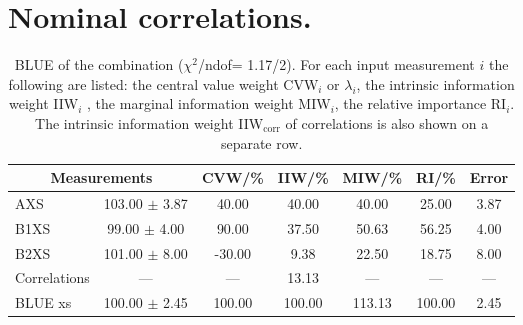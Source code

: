 \section{Nominal correlations.}
\begin{table}[H]
\scriptsize
\begin{center}
\renewcommand{\arraystretch}{1.1}
\begin{tabular}{|lc|c|c|c|c|c|}
\hline
\multicolumn{2}{|c|}{Measurements} & CVW/\%  & IIW/\%  & MIW/\%  & RI/\%  & {\tiny Error}\\
\hline
AXS &     103.00 $\pm$       3.87 &      40.00 &      40.00 &      40.00 &      25.00 &       3.87\\
B1XS &      99.00 $\pm$       4.00 &      90.00 &      37.50 &      50.63 &      56.25 &       4.00\\
B2XS &     101.00 $\pm$       8.00 &     -30.00 &       9.38 &      22.50 &      18.75 &       8.00\\
Correlations & --- & --- &      13.13 & --- & --- & ---\\
\hline
BLUE {\tiny xs} &     100.00 $\pm$       2.45 &     100.00 &     100.00 &     113.13 &     100.00 &       2.45\\
\hline
\end{tabular}
\caption{BLUE of the combination ($\chi^2$/ndof=      1.17/2).
 For each input measurement $i$ the following are listed: the central value weight CVW$_i$ or $\lambda_i$, the intrinsic information weight IIW$_i$ , the marginal information weight MIW$_i$, the relative importance RI$_i$. The intrinsic information weight IIW$_{\mathrm{corr}}$ of correlations is also shown on a separate row.}
\renewcommand{\arraystretch}{1}
\end{center}
\end{table}
